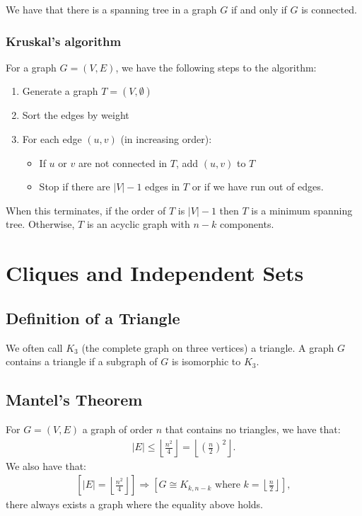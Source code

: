 \documentclass[a4paper, 12pt, twoside]{article}
\begin{document}
We have that there is a spanning tree in a graph $G$ if and only if
$G$ is connected.

\newpage

\subsubsection{Kruskal's algorithm}

For a graph $G = (V, E)$, we have 
the following steps to the algorithm: \begin{enumerate}
  \item Generate a graph $T = (V, \emptyset)$
  \item Sort the edges by weight
  \item For each edge $(u, v)$ (in increasing order): \begin{itemize}
    \item If $u$ or $v$ are not connected in $T$, add $(u, v)$ to $T$
    \item Stop if there are $|V| - 1$ edges in $T$ or if we have run
    out of edges.
  \end{itemize}
\end{enumerate} When this terminates, if the order of $T$ is $|V| - 1$
then $T$ is a minimum spanning tree. Otherwise, $T$ is an acyclic
graph with $n - k$ components.

\section{Cliques and Independent Sets}

\subsection{Definition of a Triangle}

We often call $K_3$ (the complete graph on three vertices) a triangle. A graph $G$
contains a triangle if a subgraph of $G$ is isomorphic to $K_3$.

\subsection{Mantel's Theorem}

For $G = (V, E)$ a graph of order $n$ that contains no triangles, we have that: \begin{gather*}
  |E| \leq \left\lfloor \frac{n^2}{4} \right\rfloor = \left\lfloor \left(\frac{n}{2}\right)^2 \right\rfloor.
\end{gather*} We also have that: \begin{gather*}
  \left[ |E| = \left\lfloor \frac{n^2}{4} \right\rfloor \right]
  \Rightarrow
  \left[ G \cong K_{k, n - k} \text{ where } k = \left\lfloor \frac{n}{2} \right\rfloor \right],
\end{gather*} there always exists a graph where the equality above holds.
\end{document}
